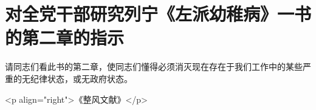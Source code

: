 \section[对全党干部研究列宁《左派幼稚病》一书的第二章的指示（一九四八年六月）]{对全党干部研究列宁《左派幼稚病》一书的第二章的指示}


请同志们看此书的第二章，使同志们懂得必须消灭现在存在于我们工作中的某些严重的无纪律状态，或无政府状态。

<p align="right">《整风文献》</p>

